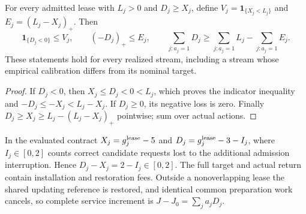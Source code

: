 \begin{proposition}
\label{prop:v2-calibration-return-link}
For every admitted lease with $L_j>0$ and $D_j\geq X_j$, define
$V_j=\mathbf1_{\{X_j<L_j\}}$ and $E_j=(L_j-X_j)_+$. Then
\begin{equation}
 \mathbf1_{\{D_j<0\}}\leq V_j,\qquad
 (-D_j)_+\leq E_j,\qquad
 \sum_{j:a_j=1}D_j\geq
 \sum_{j:a_j=1}L_j-\sum_{j:a_j=1}E_j.
 \label{eq:v2-pointwise-paid-return-link}
\end{equation}
These statements hold for every realized stream, including a stream
whose empirical calibration differs from its nominal target.
\end{proposition}
\begin{proof}
If $D_j<0$, then $X_j\leq D_j<0<L_j$, which proves the indicator
inequality and $-D_j\leq-X_j<L_j-X_j$. If $D_j\geq0$, its
negative loss is zero. Finally
$D_j\geq X_j\geq L_j-(L_j-X_j)_+$ pointwise; sum over actual actions.
\end{proof}
In the evaluated contract $X_j=g_j^{\rm lease}-5$ and
$D_j=g_j^{\rm lease}-3-I_j$, where $I_j\in[0,2]$ counts correct
candidate requests lost to the additional admission interruption.
Hence $D_j-X_j=2-I_j\in[0,2]$. The full target and actual return
contain installation and restoration fees. Outside a nonoverlapping
lease the shared updating reference is restored, and identical common
preparation work cancels, so complete service increment is
$J-J_0=\sum_j a_jD_j$.


